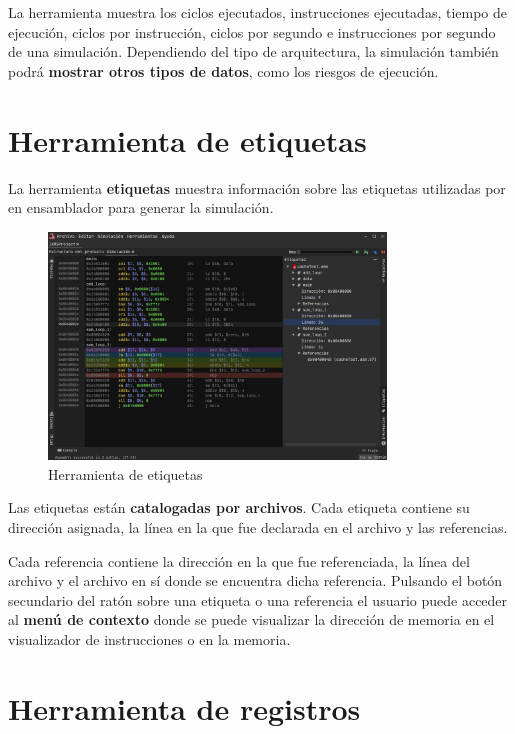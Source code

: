 La herramienta muestra los ciclos ejecutados,
instrucciones ejecutadas, tiempo de ejecución, ciclos por instrucción,
ciclos por segundo e instrucciones por segundo de una simulación.
Dependiendo del tipo de arquitectura, la simulación también podrá
\textbf{mostrar otros tipos de datos}, como los riesgos de ejecución.

\section{Herramienta de etiquetas}\label{sec:herramienta-de-etiquetas}

La herramienta \textbf{etiquetas} muestra información sobre las etiquetas
utilizadas por en ensamblador para generar la simulación.

\begin{figure}[H]
    \centering
    \includegraphics[width=0.8\textwidth]{images/tools/jams-labels}
    \caption{Herramienta de etiquetas}
    \label{fig:jams-labels}
\end{figure}

Las etiquetas están \textbf{catalogadas por archivos}.
Cada etiqueta contiene su dirección asignada,
la línea en la que fue declarada en el archivo y las referencias.

Cada referencia contiene la dirección en la que fue referenciada,
la línea del archivo y el archivo en sí donde se encuentra dicha referencia.
Pulsando el botón secundario del ratón sobre una etiqueta
o una referencia el usuario puede acceder al \textbf{menú de contexto}
donde se puede visualizar la dirección de memoria en el visualizador
de instrucciones o en la memoria.

\section{Herramienta de registros}\label{sec:herramienta-de-registros}

